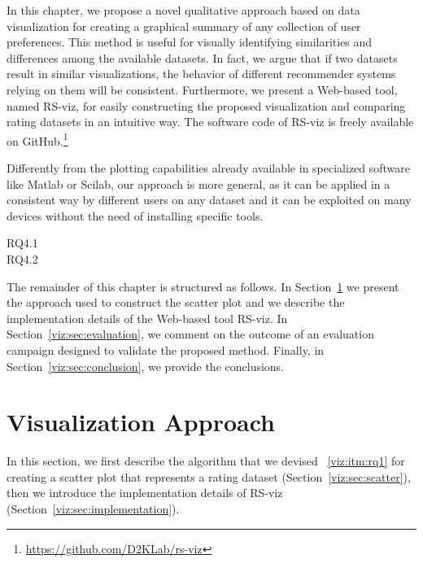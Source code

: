 In this chapter, we propose a novel qualitative approach based on data visualization for creating a graphical summary of any collection of user preferences. This method is useful for visually identifying similarities and differences among the available datasets. In fact, we argue that if two datasets result in similar visualizations, the behavior of different recommender systems relying on them will be consistent. Furthermore, we present a Web-based tool, named RS-viz, for easily constructing the proposed visualization and comparing rating datasets in an intuitive way. The software code of RS-viz is freely available on GitHub.\footnote{\url{https://github.com/D2KLab/rs-viz}}

Differently from the plotting capabilities already available in specialized software like Matlab or Scilab, our approach is more general, as it can be applied in a consistent way by different users on any dataset and it can be exploited on many devices without the need of installing specific tools.


\begin{description}
\item[RQ4.1\label{viz:itm:rq1}] 
\item[RQ4.2\label{viz:itm:rq2}] 
\end{description}

The remainder of this chapter is structured as follows. In Section~\ref{viz:sec:visualization} we present the approach used to construct the scatter plot and we describe the implementation details of the Web-based tool RS-viz. In Section~\ref{viz:sec:evaluation}, we comment on the outcome of an evaluation campaign designed to validate the proposed method. Finally, in Section~\ref{viz:sec:conclusion}, we provide the conclusions.

\section{Visualization Approach}
\label{viz:sec:visualization}

In this section, we first describe the algorithm that we devised ~\ref{viz:itm:rq1} for creating a scatter plot that represents a rating dataset (Section~\ref{viz:sec:scatter}), then we introduce the implementation details of RS-viz (Section~\ref{viz:sec:implementation}).

